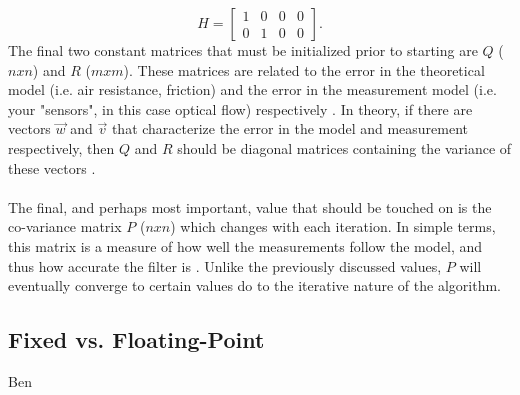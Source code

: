 \documentclass[12pt]{article} %
\begin{document}
\begin{equation}
H = \begin{bmatrix}
1 & 0 & 0 & 0 \\
0 & 1 & 0 & 0 
\end{bmatrix}.
\end{equation}
The final two constant matrices that must be initialized prior to starting are $Q$ ($nxn$) and $R$ ($mxm$). These matrices are related to the error in the theoretical model (i.e. air resistance, friction) and the error in the measurement model (i.e. your "sensors", in this case optical flow) respectively \cite{12}. In theory, if there are vectors $\vec{w}$ and $\vec{v}$ that characterize the error in the model and measurement respectively, then $Q$ and $R$ should be diagonal matrices containing the variance of these vectors \cite{4}. \\\\
The final, and perhaps most important, value that should be touched on is the co-variance matrix $P$ ($nxn$) which changes with each iteration. In simple terms, this matrix is a measure of how well the measurements follow the model, and thus how accurate the filter is \cite{12}. Unlike the previously discussed values, $P$ will eventually converge to certain values do to the iterative nature of the algorithm.
\subsection{Fixed vs. Floating-Point}
Ben
\end{document}
